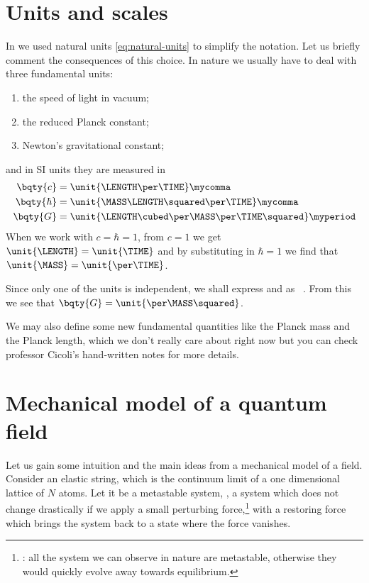     \section{Units and scales}
        In  we used natural units \eqref{eq:natural-units} to simplify the notation. Let us briefly comment the consequences of this choice. In nature we usually have to deal with three fundamental units:
        \begin{enumerate}
            \item[$c$:] the speed of light in vacuum;
            \item[$\hbar$:] the reduced Planck constant;
            \item[$G$:] Newton's gravitational constant;
        \end{enumerate}
        and in SI units they are measured in
        \begin{align*}
            \bqty{c} &= \unit{\LENGTH\per\TIME}
            \mycomma\\
            \bqty{\hbar} &= \unit{\MASS\LENGTH\squared\per\TIME}
            \mycomma\\
            \bqty{G} &= \unit{\LENGTH\cubed\per\MASS\per\TIME\squared}
            \myperiod
        \end{align*}
        When we work with $c = \hbar = 1$, from $c = 1$ we get $\unit{\LENGTH} = \unit{\TIME}$ and by substituting in $\hbar = 1$ we find that $\unit{\MASS} = \unit{\per\TIME}$.

        Since only one of the units is independent, we shall express \unit{\LENGTH} and \unit{\TIME} as \unit{\per\MASS}. From this we see that $\bqty{G} = \unit{\per\MASS\squared}$.

        We may also define some new fundamental quantities like the Planck mass and the Planck length, which we don't really care about right now but you can check professor Cicoli's hand-written notes for more details.
    \section{Mechanical model of a quantum field}
        Let us gain some intuition and the main ideas from a mechanical model of a field. Consider an elastic string, which is the continuum limit of a one dimensional lattice of $N$ atoms. Let it be a metastable system, \latinie, a system which does not change drastically if we apply a small perturbing force,\footnote{\latinNb: all the system we can observe in nature are metastable, otherwise they would quickly evolve away towards equilibrium.} with a restoring force which brings the system back to a state where the force vanishes.

